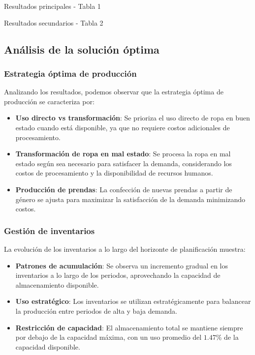\begin{table}[H]
    \centering
    \caption{Resultados principales - Tabla 1}
    \label{tab:resultados1}
    
\end{table}

\begin{table}[H]
    \centering
    \caption{Resultados secundarios - Tabla 2}
    \label{tab:resultados2}
    
\end{table}


\subsection*{Análisis de la solución óptima}

\subsubsection*{Estrategia óptima de producción}

Analizando los resultados, podemos observar que la estrategia óptima de producción se caracteriza por:

\begin{itemize}
    \item \textbf{Uso directo vs transformación}: Se prioriza el uso directo de ropa en buen estado cuando está disponible, ya que no requiere costos adicionales de procesamiento.
    \item \textbf{Transformación de ropa en mal estado}: Se procesa la ropa en mal estado según sea necesario para satisfacer la demanda, considerando los costos de procesamiento y la disponibilidad de recursos humanos.
    \item \textbf{Producción de prendas}: La confección de nuevas prendas a partir de género se ajusta para maximizar la satisfacción de la demanda minimizando costos.
\end{itemize}

\subsubsection*{Gestión de inventarios}

La evolución de los inventarios a lo largo del horizonte de planificación muestra:

\begin{itemize}
    \item \textbf{Patrones de acumulación}: Se observa un incremento gradual en los inventarios a lo largo de los periodos, aprovechando la capacidad de almacenamiento disponible.
    \item \textbf{Uso estratégico}: Los inventarios se utilizan estratégicamente para balancear la producción entre periodos de alta y baja demanda.
    \item \textbf{Restricción de capacidad}: El almacenamiento total se mantiene siempre por debajo de la capacidad máxima, con un uso promedio del $1.47$\% de la capacidad disponible.
\end{itemize}

